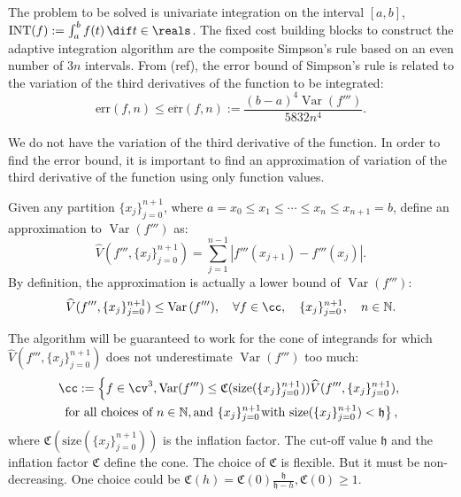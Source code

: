 \documentclass{iitthesis}
\DeclareMathOperator{\Var}{Var}
\DeclareMathOperator{\INT}{INT}
\theoremstyle{definition}
\theoremstyle{remark}
\begin{document}

The problem to be solved is univariate integration on the interval $[a,b]$, $\INT(f):=\int_{a}^{b}f(t) \, \dif t \in \reals$.  The fixed cost building blocks to construct the adaptive integration algorithm are the composite Simpson's rule based on an even number of $3n$ intervals. From (ref), the error bound of Simpson's rule is related to the variation of the third derivatives of the function to be integrated:
\begin{equation}\label{errorboundSimpson}
    \text{err}(f,n)\le\overline{\text{err}}(f,n):=\frac{(b-a)^4\Var(f''')}{5832n^4}.
\end{equation}

We do not have the variation of the third derivative of the function. In order to find the error bound, it is important to find an approximation of variation of the third derivative of the function using only function values.

Given any partition $\{x_j\}_{j=0}^{n+1}$, where $a=x_{0}\le x_{1}\le\cdots\le x_{n}\le x_{n+1}=b$, define an approximation to $\Var(f''')$ as:
$$\widehat{V}(f''',\{x_j\}_{j=0}^{n+1})=\sum_{j=1}^{n-1}|f'''(x_{j+1})-f'''(x_{j})|.$$
By definition, the approximation is actually a lower bound of $\Var(f''')$:
\begin{equation}\label{vhatlessvar}
    \widehat{V}(f''',\{x_j\}_{j=0}^{n+1})\leq\Var{(f''')}, \quad \forall f \in \cc, \quad \{x_j\}_{j=0}^{n+1}, \quad n \in \mathbb{N}.
\end{equation}

The algorithm will be guaranteed to work for the cone of integrands for which $\widehat{V}(f''',\{x_j\}_{j=0}^{n+1})$ does not underestimate $\Var{(f''')}$ too much:
\begin{multline}\label{coneinteg}
\cc:=\left\{f\in \cv^{3}, \Var(f''')\leq \mathfrak{C}(\text{size}(\{x_j\}_{j=0}^{n+1}))\widehat{V}(f''',\{x_j\}_{j=0}^{n+1}),\right.\\ \left.\text{for all choices of } n\in \mathbb{N}, \text{and }\{x_j\}_{j=0}^{n+1} \text{with }\text{size}(\{x_j\}_{j=0}^{n+1})<\mathfrak{h}\right\},
\end{multline}
where $\mathfrak{C}(\text{size}(\{x_j\}_{j=0}^{n+1}))$ is the inflation factor. The cut-off value $\mathfrak{h}$ and the inflation factor $\mathfrak{C}$ define the cone. The choice of $\mathfrak{C}$ is flexible. But it must be non-decreasing. One choice could be $\mathfrak{C}(h)=\mathfrak{C}(0)\frac{\mathfrak{h}}{\mathfrak{h}-h}, \mathfrak{C}(0)\ge1$.
\end{document}

